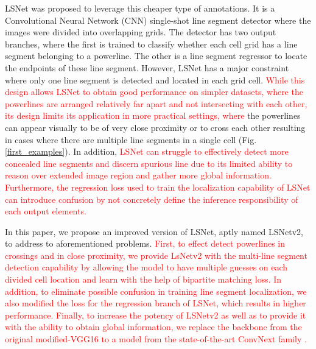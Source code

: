 \documentclass[journal]{IEEEtran}
\newcommand{\textK}[1]{\textcolor{red}{#1}}
\begin{document}
LSNet \cite{Nguyen2020} was proposed to leverage this cheaper type of annotations. It is a Convolutional Neural Network (CNN) single-shot line segment detector where the images were divided into overlapping grids. The detector has two output branches, where the first is trained to classify whether each cell grid has a line segment belonging to a powerline. The other is a line segment regressor to locate the endpoints of these line segment. However, LSNet has a major constraint where only one line segment is detected and located in each grid cell. \textK{While this design allows LSNet to obtain good performance on simpler datasets, where the powerlines are arranged relatively far apart and not intersecting with each other, its design limits its application in more practical settings, where} the powerlines can appear visually to be of very close proximity or to cross each other resulting in cases where there are multiple line segments in a single cell (Fig. \ref{first_examples}). In addition, \textK{LSNet can struggle to effectively detect more concealed line segments and discern spurious line due to its limited ability to reason over extended image region and gather more global information. Furthermore, the regression loss used to train the localization capability of LSNet can introduce confusion by not concretely define the inference responsibility of each output elements.}

In this paper, we propose an improved version of LSNet, aptly named LSNetv2, to address to aforementioned problems. \textK{First, to effect detect powerlines in crossings and in close proximity, we provide LsNetv2 with the multi-line segment detection capability by allowing the model to have multiple guesses on each divided cell location and learn with the help of bipartite matching loss. In addition, to eliminate possible confusion in training line segment localization, we also modified the loss for the regression branch of LSNet, which results in higher performance. Finally, to increase the potency of LSNetv2 as well as to provide it with the ability to obtain global information, we replace the backbone from the original modified-VGG16 \cite{vgg} to a model from the state-of-the-art ConvNext family \cite{convnext}.}
\end{document}
